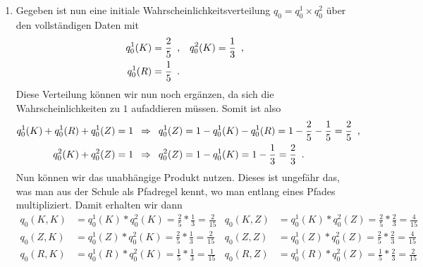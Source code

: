\documentclass[ngerman, a4paper, 12pt]{article}
\newcommand{\satzende}{\enskip \text{.}}
\newcommand{\komma}{\enskip \text{,}}
\begin{document}
\begin{enumerate}[label=\textbf{(\alph*)}, leftmargin=0pt]
	\item 
	Gegeben ist nun eine initiale Wahrscheinlichkeitsverteilung $q_0 = q_0^1 \times q_0^2$ über den vollständigen Daten mit
	\begin{align*}
		q_0^1(K) &= \frac{2}{5} \komma & q_0^2(K) &= \frac{1}{3} \komma \\
		q_0^1(R) &= \frac{1}{5}  \satzende
	\end{align*}
	Diese Verteilung können wir nun noch ergänzen, da sich die Wahrscheinlichkeiten zu $1$ aufaddieren müssen. Somit ist also
	\begin{equation*} 
		\begin{aligned}
			q_0^1(K) + q_0^1(R) + q_0^1(Z) = 1 &\follows q_0^1(Z) = 1 - q_0^1(K) - q_0^1(R) = 1 - \frac{2}{5} - \frac{1}{5} = \frac{2}{5} \komma \\
			q_0^2(K) + q_0^2(Z) = 1 &\follows q_0^2(Z) = 1 - q_0^1(K) = 1 - \frac{1}{3} = \frac{2}{3} \satzende 
		\end{aligned}
	\end{equation*}
	Nun können wir das unabhängige Produkt nutzen. Dieses ist ungefähr das, was man aus der Schule als Pfadregel kennt, wo man entlang eines Pfades multipliziert.
	Damit erhalten wir dann
	\begin{align*}
		q_0(K,K) &= q_0^1(K) * q_0^2(K) = \frac{2}{5} * \frac{1}{3} = \frac{2}{15} 
		& q_0(K,Z) &= q_0^1(K) * q_0^2(Z) = \frac{2}{5} * \frac{2}{3} = \frac{4}{15} \\
		q_0(Z,K) &= q_0^1(Z) * q_0^2(K) = \frac{2}{5} * \frac{1}{3} = \frac{2}{15}
		& q_0(Z,Z) &= q_0^1(Z) * q_0^2(Z) = \frac{2}{5} * \frac{2}{3} = \frac{4}{15} \\
		q_0(R,K) &= q_0^1(R) * q_0^2(K) = \frac{1}{5} * \frac{1}{3} = \frac{1}{15}
		& q_0(R,Z) &= q_0^1(R) * q_0^2(Z) = \frac{1}{5} * \frac{2}{3} = \frac{2}{15}
	\end{align*}
	

\end{enumerate}
\end{document}
